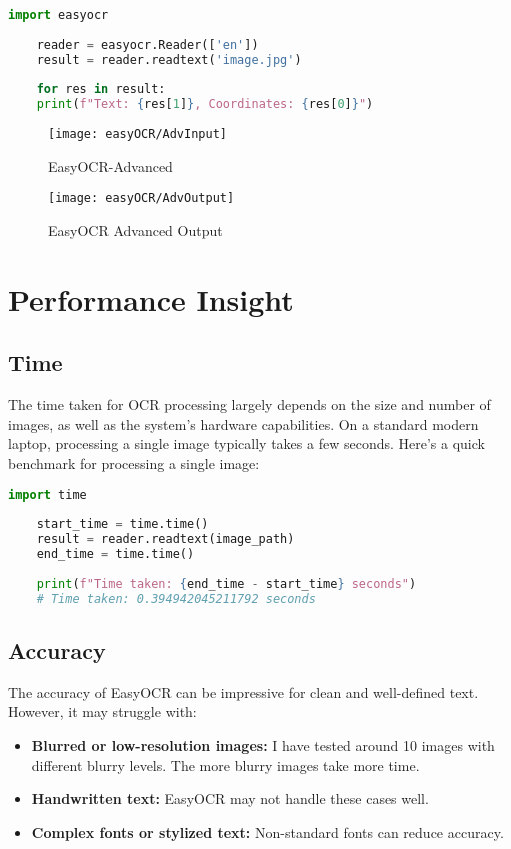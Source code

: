 \begin{lstlisting}[language=Python, caption=Getting Bounding Boxes]
	import easyocr
	
	reader = easyocr.Reader(['en'])
	result = reader.readtext('image.jpg')
	
	for res in result:
	print(f"Text: {res[1]}, Coordinates: {res[0]}")
\end{lstlisting}

\begin{figure}[h]
	\centering
	\texttt{[image: easyOCR/AdvInput]}
	\caption{EasyOCR-Advanced}\label{EasyOCR-Advanced}
\end{figure}

\begin{figure}[h]
	\centering
	\texttt{[image: easyOCR/AdvOutput]}
	\caption{EasyOCR Advanced Output}\label{EasyOCR Advanced Output}
\end{figure}

\section{Performance Insight}

\subsection{Time}
The time taken for OCR processing largely depends on the size and number of images, as well as the system's hardware capabilities. On a standard modern laptop, processing a single image typically takes a few seconds. Here’s a quick benchmark for processing a single image:

\begin{lstlisting}[language=Python, caption=Timing an OCR process]
	import time
	
	start_time = time.time()
	result = reader.readtext(image_path)
	end_time = time.time()
	
	print(f"Time taken: {end_time - start_time} seconds")
	# Time taken: 0.394942045211792 seconds
\end{lstlisting}

\subsection{Accuracy}
The accuracy of EasyOCR can be impressive for clean and well-defined text. However, it may struggle with:
\begin{itemize}
	\item \textbf{Blurred or low-resolution images:} I have tested around 10 images with different blurry levels. The more blurry images take more time.
	\item \textbf{Handwritten text:} EasyOCR may not handle these cases well.
	\item \textbf{Complex fonts or stylized text:} Non-standard fonts can reduce accuracy.
\end{itemize}

